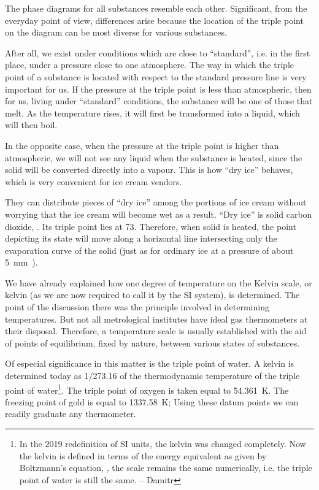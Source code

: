 The phase diagrams for all substances resemble each other. Significant, from the everyday point of view, differ­ences arise because the location of the triple point on the diagram can be most diverse for various substances.

After all, we exist under conditions which are close to ``standard'', i.e. in the first place, under a pressure close to one atmosphere. The way in which the triple point of a substance is located with respect to the standard pressure line is very important for us.
If the pressure at the triple point is less than atmospher­ic, then for us, living under ``standard'' conditions, the substance will be one of those that melt. As the temper­ature rises, it will first be transformed into a liquid, which will then boil.

In the opposite case, when the pressure at the triple point is higher than atmospheric, we will not see any liquid when the substance is heated, since the solid will be converted directly into a vapour. This is how ``dry ice'' behaves, which is very convenient for ice cream vendors.

They can distribute pieces of ``dry ice'' among the portions of ice cream without worrying that the ice cream will become wet as a result. “Dry ice” is solid carbon dioxide, . Its triple point lies at \SI{73}{\atmos}. Therefore, when solid  is heated, the point depicting its state will move along a horizontal line intersecting only the evaporation curve of the solid (just as for ordinary ice at a pressure of about \SI{5}{\milli\meter\mercury}).

We have already explained how one degree of temper­ature on the Kelvin scale, or kelvin (as we are now required to call it by the SI system), is determined. The point of the discussion there was the principle involved in determining temperatures. But not all metrological institutes have ideal gas thermometers at their disposal. Therefore, a temperature scale is usually established with the aid of points of equilibrium, fixed by nature, between various states of substances.

Of especial significance in this matter is the triple point of water. A kelvin is determined today as 1/273.16 of the thermodynamic temperature of the triple point of water\footnote{In the 2019 redefinition of SI units, the kelvin was changed completely. Now the kelvin is defined in terms of the energy equivalent as given by Boltzmann's equation, , the scale remains the same numerically, i.e. the triple point of water is still the same. -- Damitr}. The triple point of oxygen is taken equal to \SI{54.361}{\kelvin}. The freezing point of gold is equal to \SI{1337.58}{\kelvin}; Using these datum points we can readily graduate any ther­mometer.

